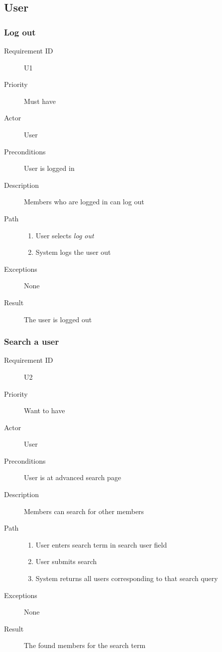 	\subsection{User}
		\subsubsection{Log out}
			\begin{description}
				\item[Requirement ID] U1
				\item[Priority] Must have
				\item[Actor] User
				\item[Preconditions] User is logged in
				\item[Description] Members who are logged in can log out
				\item[Path]
 					\begin{enumerate}
						\item User selects \emph{log out}
						\item System logs the user out
					\end{enumerate}
				\item[Exceptions] None
				\item[Result] The user is logged out
			\end{description}
		\subsubsection{Search a user}
			\begin{description}
				\item[Requirement ID] U2
				\item[Priority] Want to have
				\item[Actor] User
				\item[Preconditions] User is at advanced search page
				\item[Description] Members can search for other members 
				\item[Path]
 					\begin{enumerate}
						\item User enters search term in search user field
						\item User submits search
						\item System returns all users corresponding to that search 
						query
					\end{enumerate}
				\item[Exceptions] None
				\item[Result] The found members for the search term
			\end{description}
